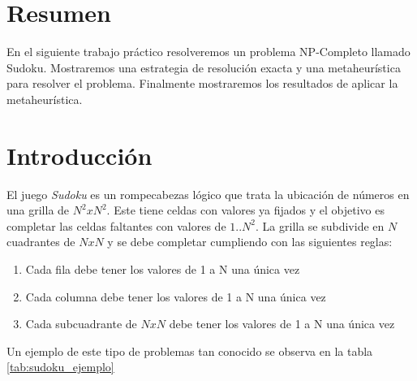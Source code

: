 \documentclass[a4paper,spanish]{article}
\begin{document}


\tableofcontents
\pagebreak

\section{Resumen}
En el siguiente trabajo práctico resolveremos un problema NP-Completo llamado
Sudoku. Mostraremos una estrategia de resolución exacta y una metaheurística
para resolver el problema. Finalmente mostraremos los resultados de aplicar la
metaheurística.


\section{Introducción}
\label{sec:intro}

El juego \emph{Sudoku} es un rompecabezas lógico que trata la ubicación de
números en una grilla de $N^2 x N^2$. Este tiene celdas con valores ya fijados y
el objetivo es completar las celdas
faltantes con valores de $1..N^2$. La grilla se subdivide en $N$ cuadrantes de
$N x N$  y se debe completar cumpliendo con las siguientes reglas:

\begin{enumerate}
    \label{enum:principios}

    \item Cada fila debe tener los valores de 1 a N una única vez
    \item Cada columna debe tener los valores de 1 a N una única vez
    \item Cada subcuadrante de $NxN$ debe tener los valores de 1 a N una única vez
\end{enumerate}

Un ejemplo de este tipo de problemas tan conocido se observa en la tabla
\ref{tab:sudoku_ejemplo}
\end{document}
